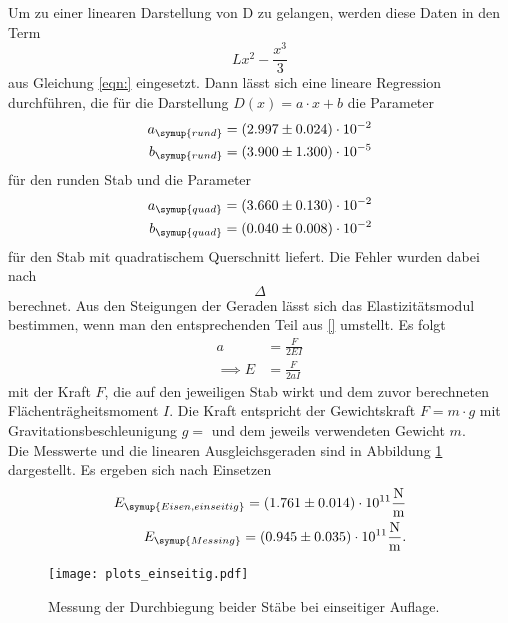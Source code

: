   \noindent Um zu einer linearen Darstellung von D zu gelangen, werden diese Daten in den Term
  \begin{equation*}
    L x^2 - \frac{x^3}{3}
  \end{equation*}
  aus Gleichung \eqref{eqn:} eingesetzt. Dann lässt sich eine lineare Regression durchführen, die 
  für die Darstellung $D(x) = a \cdot x + b$ die Parameter
  \begin{align*}
    a_{\symup{rund}} = \left(2.997 \pm 0.024 \right) \cdot 10^{-2}\\
    b_{\symup{rund}} = \left(3.900 \pm 1.300 \right) \cdot 10^{-5}\\
  \end{align*}
  für den runden Stab und die Parameter
  \begin{align*}
    a_{\symup{quad}} = \left( 3.660 \pm 0.130 \right) \cdot 10^{-2}\\
    b_{\symup{quad}} = \left(0.040 \pm 0.008 \right) \cdot 10^{-2}\\
  \end{align*}
  für den Stab mit quadratischem Querschnitt liefert. Die Fehler wurden dabei nach 
  \begin{equation}
    \Delta
    \label{eqn:linerr}
  \end{equation}
  berechnet. Aus den Steigungen der Geraden lässt sich das Elastizitätsmodul bestimmen, wenn man den 
  entsprechenden Teil aus \ref{} umstellt. Es folgt
  \begin{align*}
    a &= \frac{F}{2 E I}\\
    \implies E &= \frac{F}{2 a I}
  \end{align*}
  mit der Kraft $F$, die auf den jeweiligen Stab wirkt und dem zuvor berechneten Flächenträgheitsmoment $I$.
  Die Kraft entspricht der Gewichtskraft $F = m \cdot g$ mit Gravitationsbeschleunigung $g = $ \cite{}
  und dem jeweils verwendeten Gewicht $m$. \\
  Die Messwerte und die linearen Ausgleichsgeraden sind in Abbildung \ref{fig:plots} dargestellt.
  Es ergeben sich nach Einsetzen
  \begin{align*}
    E_{\symup{Eisen, einseitig}} = \left( 1.761 \pm 0.014\right)\cdot 10^{11} \si{\newton\per\m}\\
    E_{\symup{Messing}} = \left( 0.945 \pm 0.035 \right)\cdot 10^{11} \si{\newton\per\m}.\\ %
  \end{align*}

  \begin{figure}
    \centering
    \texttt{[image: plots\_einseitig.pdf]}
    \caption{Messung der Durchbiegung beider Stäbe bei einseitiger Auflage.}
    \label{fig:plots}
  \end{figure}
  

